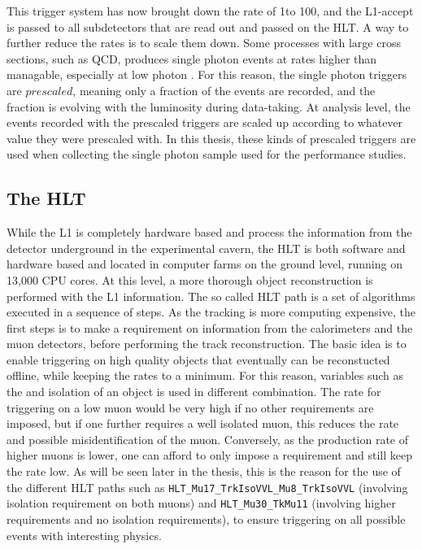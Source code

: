 This trigger system has now brought down the rate of 1\GHz to 100\kHz, and the L1-accept is passed to all subdetectors that are read out and passed on the HLT.
A way to further reduce the rates is to scale them down. 
Some processes with large cross sections, such as QCD, produces single photon events at rates higher than managable, especially at low photon \pt. 
For this reason, the single photon triggers are $prescaled$, meaning only a fraction of the events are recorded, and the fraction is evolving with the luminosity during data-taking. 
At analysis level, the events recorded with the prescaled triggers are scaled up according to whatever value they were prescaled with. 
In this thesis, these kinds of prescaled triggers are used when collecting the single photon sample used for the \ptmiss performance studies.  
\subsection{The HLT}
While the L1 is completely hardware based and process the information from the detector underground in the experimental cavern, the HLT is both software and hardware based and located in computer farms on the ground level, running on 13,000 CPU cores. 
At this level, a more thorough object reconstruction is performed with the L1 information. The so called HLT path is a set of algorithms executed in a sequence of steps. 
As the tracking is more computing expensive, the first steps is to make a requirement on information from the calorimeters and the muon detectors, before performing the track reconstruction. 
The basic idea is to enable triggering on high quality objects that eventually can be reconstucted offline, while keeping the rates to a minimum. 
For this reason, variables such as the \pt and isolation of an object is used in different combination. 
The rate for triggering on a low \pt muon would be very high if no other requirements are imposed, but if one further requires a well isolated muon, this reduces the rate and possible misidentification of the muon. 
Conversely, as the production rate of higher \pt muons is lower, one can afford to only impose a \pt requirement and still keep the rate low.   
As will be seen later in the thesis, this is the reason for the use of the different HLT paths such as \texttt{HLT\_Mu17\_TrkIsoVVL\_Mu8\_TrkIsoVVL} (involving isolation requirement on both muons) and \texttt{HLT\_Mu30\_TkMu11} (involving higher \pt requirements and no isolation requirements), to ensure triggering on all possible events with interesting physics.
